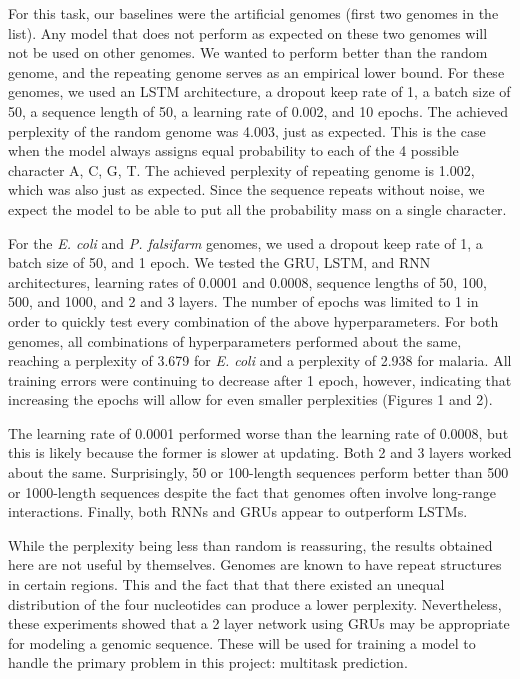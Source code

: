 \documentclass{article} %
\begin{document}
For this task, our baselines were the artificial genomes (first two genomes in the list). Any model that does not perform as expected on these two genomes will not be used on other genomes. We wanted to perform better than the random genome, and the repeating genome serves as an empirical lower bound. For these genomes, we used an LSTM architecture, a dropout keep rate of 1, a batch size of 50, a sequence length of 50, a learning rate of 0.002, and 10 epochs. The achieved perplexity of the random genome was 4.003, just as expected. This is the case when the model always assigns equal probability to each of the 4 possible character A, C, G, T. The achieved perplexity of repeating genome is 1.002, which was also just as expected. Since the sequence repeats without noise, we expect the model to be able to put all the probability mass on a single character.

For the \textit{E. coli} and \textit{P. falsifarm} genomes, we used a dropout keep rate of 1, a batch size of 50, and 1 epoch. We tested the GRU, LSTM, and RNN architectures, learning rates of 0.0001 and 0.0008, sequence lengths of 50, 100, 500, and 1000, and 2 and 3 layers. The number of epochs was limited to 1 in order to quickly test every combination of the above hyperparameters. For both genomes, all combinations of hyperparameters performed about the same, reaching a perplexity of 3.679 for \textit{E. coli} and a perplexity of 2.938 for malaria. All training errors were continuing to decrease after 1 epoch, however, indicating that increasing the epochs will allow for even smaller perplexities (Figures 1 and 2).

The learning rate of 0.0001 performed worse than the learning rate of 0.0008, but this is likely because the former is slower at updating. Both 2 and 3 layers worked about the same. Surprisingly, 50 or 100-length sequences perform better than 500 or 1000-length sequences despite the fact that genomes often involve long-range interactions. Finally, both RNNs and GRUs appear to outperform LSTMs.

While the perplexity being less than random is reassuring, the results obtained here are not useful by themselves. Genomes are known to have repeat structures in certain regions. This and the fact that that there existed an unequal distribution of the four nucleotides can produce a lower perplexity. Nevertheless, these experiments showed that a 2 layer network using GRUs may be appropriate for modeling a genomic sequence. These will be used for training a model to handle the primary problem in this project: multitask prediction.
\end{document}
